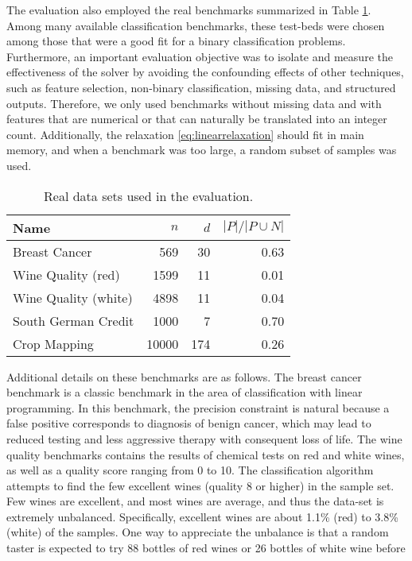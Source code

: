 \documentclass[11pt]{article}
\theoremstyle{definition}
\begin{document}
The evaluation also employed the real benchmarks summarized
in Table \ref{tab:benchmarks}.
Among many available classification benchmarks, 
these test-beds were chosen among those that were
a good fit for a binary classification problems.
Furthermore, an important evaluation objective was 
to isolate and measure the 
effectiveness of the solver by avoiding the 
confounding effects of other techniques,
such as feature selection, non-binary classification,
missing data, and structured outputs.
Therefore, we only used benchmarks without missing data
and with features that are numerical or that can naturally
be translated into an integer count. 
Additionally, the relaxation \eqref{eq:linearrelaxation} should fit in main memory, and when a benchmark was too large,
a random subset of samples was used.
\begin{table}
\centering
\begin{tabular}{l|r|r|r}
{\bf Name\/} &  $n$ & $d$ & $|P| / |P \cup N|$ \\ \hline\hline
Breast Cancer & 569 & 30 & 0.63 \\ \hline
Wine Quality (red) & 1599 & 11 & 0.01 \\ \hline
Wine Quality (white) & 4898 & 11 & 0.04 \\ \hline
South German Credit & 1000 & 7 & 0.70 \\ \hline
Crop Mapping & 10000 & 174 & 0.26 \\ \hline
\end{tabular}
\caption{Real data sets used in the evaluation.}
\label{tab:benchmarks}
\end{table}
Additional details on these benchmarks are as follows.
The breast cancer benchmark \cite{breastcancer}
is a classic benchmark in the area of 
classification with linear programming. 
In this benchmark, the precision constraint is natural 
because a false positive corresponds to diagnosis of benign cancer,
which may lead to reduced testing
and less aggressive therapy with consequent loss of life.
The wine quality benchmarks \cite{winequality}
contains the results of chemical tests
on red and white wines, as well as a quality score
ranging from 0 to 10.
The classification algorithm attempts to find
the few excellent wines (quality 8 or higher)
in the sample set. 
Few wines are excellent, and most wines are average,
and thus the data-set is extremely unbalanced. 
Specifically, excellent wines are about 
1.1\% (red) to 3.8\% (white) of the samples.
One way to appreciate the unbalance is that 
a random taster is expected to try 88 bottles
of red wines or 26 bottles of white wine before
\end{document}

